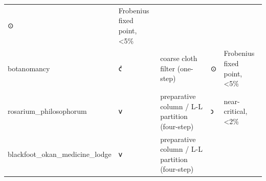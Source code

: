 \begin{longtable}[]{@{}lllll@{}}
\begin{minipage}[t]{0.17\columnwidth}
⊙\strut
\end{minipage} & \begin{minipage}[t]{0.17\columnwidth}\raggedright
Frobenius fixed point, \textless5\%\strut
\end{minipage}\tabularnewline
\begin{minipage}[t]{0.17\columnwidth}\raggedright
botanomancy\strut
\end{minipage} & \begin{minipage}[t]{0.17\columnwidth}\raggedright
𐑒\strut
\end{minipage} & \begin{minipage}[t]{0.17\columnwidth}\raggedright
coarse cloth filter (one-step)\strut
\end{minipage} & \begin{minipage}[t]{0.17\columnwidth}\raggedright
⊙\strut
\end{minipage} & \begin{minipage}[t]{0.17\columnwidth}\raggedright
Frobenius fixed point, \textless5\%\strut
\end{minipage}\tabularnewline
\begin{minipage}[t]{0.17\columnwidth}\raggedright
rosarium\_philosophorum\strut
\end{minipage} & \begin{minipage}[t]{0.17\columnwidth}\raggedright
𐑫\strut
\end{minipage} & \begin{minipage}[t]{0.17\columnwidth}\raggedright
preparative column / L-L partition (four-step)\strut
\end{minipage} & \begin{minipage}[t]{0.17\columnwidth}\raggedright
𐑮\strut
\end{minipage} & \begin{minipage}[t]{0.17\columnwidth}\raggedright
near-critical, \textless2\%\strut
\end{minipage}\tabularnewline
\begin{minipage}[t]{0.17\columnwidth}\raggedright
blackfoot\_okan\_medicine\_lodge\strut
\end{minipage} & \begin{minipage}[t]{0.17\columnwidth}\raggedright
𐑫\strut
\end{minipage} & \begin{minipage}[t]{0.17\columnwidth}\raggedright
preparative column / L-L partition (four-step)\strut
\end{minipage} & \begin{minipage}[t]{0.17\columnwidth}\raggedright

\end{minipage}
\end{longtable}
